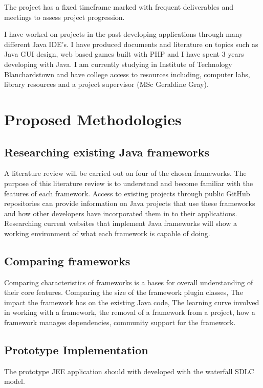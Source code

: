 \documentclass[]{report}
\begin{document}
	The project has a fixed timeframe marked with frequent deliverables and meetings to assess project progression.

	I have worked on projects in the past developing applications through many different Java IDE's. I have produced documents and literature on topics such as Java GUI design, web based games built with PHP and I have spent 3 years developing with Java. I am currently studying in Institute of Technology Blanchardstown and have college access to resources including, computer labs, library resources and a project supervisor (MSc Geraldine Gray).

\section{Proposed Methodologies}
	\subsection{Researching existing Java frameworks}
	A literature review will be carried out on four of the chosen frameworks. The purpose of this literature review is to understand and become familiar with the features of each framework. Access to existing projects through public GitHub repositories can provide information on Java projects that use these frameworks and how other developers have incorporated them in to their applications. Researching current websites that implement Java frameworks will show a working environment of what each framework is capable of doing.
	
	
	\subsection{Comparing frameworks}
	Comparing characteristics of frameworks is a bases for overall understanding of their core features. Comparing the size of the framework plugin classes, The impact the framework has on the existing Java code, The learning curve involved in working with a framework, the removal of a framework from a project, how a framework manages dependencies, community support for the framework.

\newpage	

	\subsection{Prototype Implementation}
	The prototype JEE application should with developed with the waterfall SDLC model. 
\end{document}
